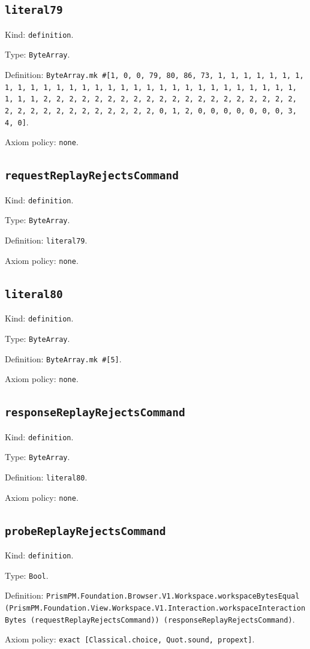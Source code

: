 \documentclass[11pt]{article}
\begin{document}
\subsection*{\texttt{literal79}}
\noindent Kind: \texttt{definition}.\par
\noindent Type: \texttt{ByteArray}.\par
\noindent Definition: \texttt{ByteArray.mk \#[1, 0, 0, 79, 80, 86, 73, 1, 1, 1, 1, 1, 1, 1, 1, 1, 1, 1, 1, 1, 1, 1, 1, 1, 1, 1, 1, 1, 1, 1, 1, 1, 1, 1, 1, 1, 1, 1, 1, 1, 2, 2, 2, 2, 2, 2, 2, 2, 2, 2, 2, 2, 2, 2, 2, 2, 2, 2, 2, 2, 2, 2, 2, 2, 2, 2, 2, 2, 2, 2, 2, 2, 0, 1, 2, 0, 0, 0, 0, 0, 0, 0, 3, 4, 0]}.\par
\noindent Axiom policy: \texttt{none}.\par
\subsection*{\texttt{requestReplayRejectsCommand}}
\noindent Kind: \texttt{definition}.\par
\noindent Type: \texttt{ByteArray}.\par
\noindent Definition: \texttt{literal79}.\par
\noindent Axiom policy: \texttt{none}.\par
\subsection*{\texttt{literal80}}
\noindent Kind: \texttt{definition}.\par
\noindent Type: \texttt{ByteArray}.\par
\noindent Definition: \texttt{ByteArray.mk \#[5]}.\par
\noindent Axiom policy: \texttt{none}.\par
\subsection*{\texttt{responseReplayRejectsCommand}}
\noindent Kind: \texttt{definition}.\par
\noindent Type: \texttt{ByteArray}.\par
\noindent Definition: \texttt{literal80}.\par
\noindent Axiom policy: \texttt{none}.\par
\subsection*{\texttt{probeReplayRejectsCommand}}
\noindent Kind: \texttt{definition}.\par
\noindent Type: \texttt{Bool}.\par
\noindent Definition: \texttt{PrismPM.Foundation.Browser.V1.Workspace.workspaceBytesEqual (PrismPM.Foundation.View.Workspace.V1.Interaction.workspaceInteractionBytes (requestReplayRejectsCommand)) (responseReplayRejectsCommand)}.\par
\noindent Axiom policy: \texttt{exact [Classical.choice, Quot.sound, propext]}.\par
\end{document}
